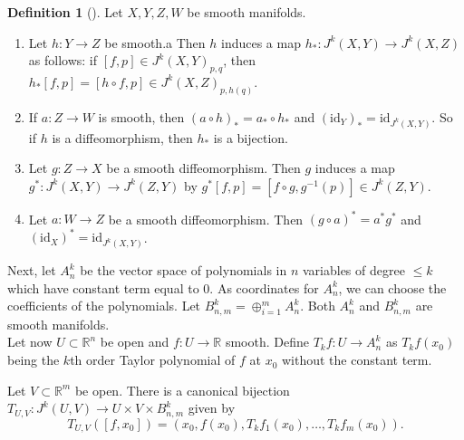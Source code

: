 \documentclass[reqno]{amsart}
\theoremstyle{definition}
\newtheorem{definition}[theorem]{Definition}
\theoremstyle{remark}
\newcommand{\id}{{\mathrm{id}}}
\begin{document}
\begin{definition}[]
    Let $X,Y,Z,W$ be smooth manifolds.
    \begin{enumerate}
        \item Let $h \colon Y \to Z$ be smooth.a
            Then $h$ induces a map
            $h_* \colon J^{k}(X,Y) \to 
            J^{k}(X,Z)$ as follows:
            if $\left[ f,p \right]  \in J^{k}(X,Y)_{p,q}$, then
            $h_* \left[ f,p \right] =
            \left[ h \circ f, p \right] 
            \in J^{k}\left( X,Z \right)_{p,h(q)}$.
        \item If $a \colon Z \to W$ is smooth, then
            $\left( a \circ h \right)_{*}
            = a_* \circ h_*$ and
            $\left( \id_Y \right)_* = 
            \id_{J^{k}(X,Y)}$. So if
            $h$ is a diffeomorphism, then
            $h_*$ is a bijection.
        \item Let $g \colon Z \to X$ be a smooth
            diffeomorphism. Then
            $g$ induces a map
            $g^{*} \colon J^{k}(X,Y) \to 
            J^{k}(Z,Y)$ by
            $g^{*}\left[ f,p \right] =
            \left[ f \circ g, g^{-1}(p) \right] 
            \in J^k (Z,Y)$.
            \item Let $a \colon W \to Z$ be a smooth diffeomorphism.
            Then $\left( g \circ a \right)^{*}=
            a^{*} g^{*}$ and
            $\left( \id_X \right)^{*} = 
            \id_{J^{k}(X,Y)}$.
    \end{enumerate}
\end{definition}



Next, let
$A_n^{k}$ be the vector space of polynomials in $n$ variables
of degree $\le k$ which have constant term equal to $0$.
As coordinates for $A_n^{k}$, we can choose the
coefficients of the polynomials.
Let $B_{n,m}^{k} = \oplus_{i=1}^{m} A_n^{k}$.
Both $A_{n}^{k}$ and
$B_{n,m}^{k}$ are smooth manifolds.\\

Let now $U \subset \mathbb{R}^{n}$ be open and
$f \colon U \to \mathbb{R}$ smooth. Define
$T_kf \colon U \to A_n^{k}$ as
$T_kf(x_0)$ being 
the $k$th order Taylor polynomial of $f$ at $x_0$ without the
constant term.

Let $V \subset \mathbb{R}^{m}$ be open. There is a canonical
bijection
$T_{U,V} \colon
J^{k}(U,V) \to U \times V \times B_{n,m}^{k}$ given by
\[
T_{U,V} \left( \left[ f,x_0 \right]  \right) 
= \left( x_0, f(x_0), T_{k}f_1 (x_0),
\ldots, T_kf_m (x_0) \right) .
\] 
\end{document}
